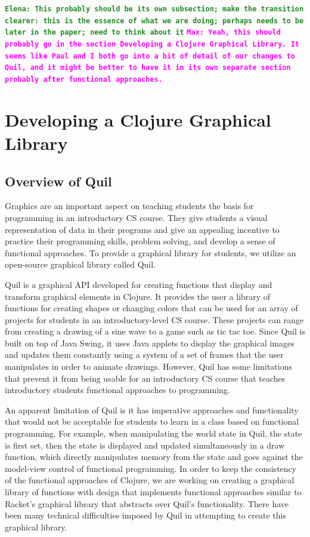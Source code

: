 \documentclass[12pt]{article}
\newcommand{\comment}[1]{{\bf \tt  {#1}}}
\newcommand{\emcomment}[1]{\textcolor{ForestGreen}{\comment{Elena: {#1}}}}
\newcommand{\todo}[1]{\textcolor{blue}{\comment{To Do: {#1}}}}
\newcommand{\mmcomment}[1]{\textcolor{magenta}{\comment{Max: {#1}}}}
\begin{document}
\emcomment{This probably should be its own subsection; make the transition clearer: this is the essence of what we are doing; perhaps needs to be later in the paper; need to think about it}
\mmcomment{Yeah, this should probably go in the section Developing a Clojure Graphical Library. It seems like Paul and I both go into a bit of detail of our changes to Quil, and it might be better to have it in its own separate section probably after functional approaches.}


\section{Developing a Clojure Graphical Library}\label{sec:library}

\subsection{Overview of Quil}\label{subsec:quil}
Graphics are an important aspect on teaching students the basis for programming in an introductory CS course. They give students a visual representation of data in their programs and give an appealing incentive to practice their programming skills, problem solving, and develop a sense of functional approaches. To provide a graphical library for students, we utilize an open-source graphical library called Quil.

Quil is a graphical API developed for creating functions that display and transform graphical elements in Clojure. It provides the user a library of functions for creating shapes or changing colors that can be used for an array of projects for students in an introductory-level CS course. These projects can range from creating a drawing of a sine wave to a game such as tic tac toe. Since Quil is built on top of Java Swing, it uses Java applets to display the graphical images and updates them constantly using a system of a set of frames that the user manipulates in order to animate drawings. However, Quil has some limitations that prevent it from being usable for an introductory CS course that teaches introductory students functional approaches to programming.

An apparent limitation of Quil is it has imperative approaches and functionality that would not be acceptable for students to learn in a class based on functional programming. For example, when manipulating the world state in Quil, the state is first set, then the state is displayed and updated simultaneously in a draw function, which directly manipulates memory from the state and goes against the model-view control of functional programming. In order to keep the consistency of the functional approaches of Clojure, we are working on creating a graphical library of functions with design that implements functional approaches similar to Racket’s graphical library that abstracts over Quil's functionality. There have been many technical difficulties imposed by Quil in attempting to create this graphical library.
\end{document}
